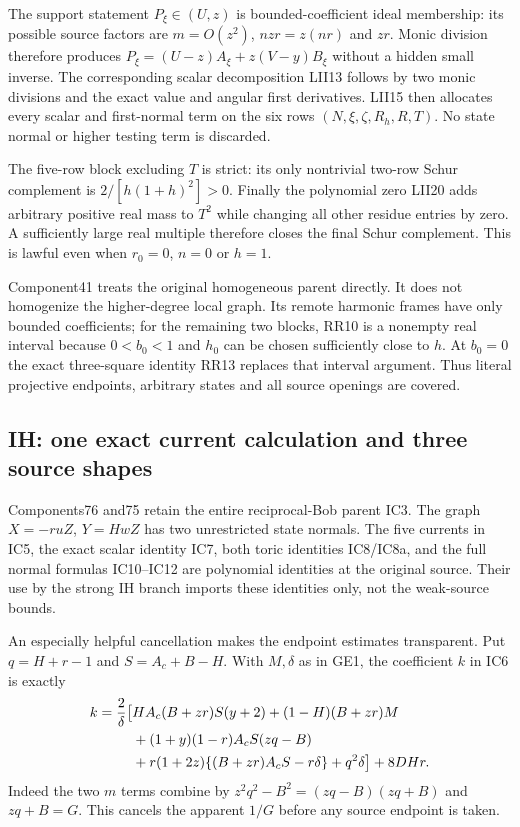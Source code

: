 The support statement $P_\xi\in(U,z)$ is bounded-coefficient ideal
membership: its possible source factors are $m=O(z^2)$,
$nzr=z(nr)$ and $zr$. Monic division therefore produces
$P_\xi=(U-z)A_\xi+z(V-y)B_\xi$ without a hidden small inverse.
The corresponding scalar decomposition LII13 follows by two monic
divisions and the exact value and angular first derivatives. LII15
then allocates every scalar and first-normal term on the six rows
$(N,\xi,\zeta,R_h,R,T)$. No state normal or higher testing term is
discarded.

The five-row block excluding $T$ is strict: its only nontrivial
two-row Schur complement is $2/[h(1+h)^2]>0$. Finally the polynomial
zero LII20 adds arbitrary positive real mass to $T^2$ while changing
all other residue entries by zero. A sufficiently large real multiple
therefore closes the final Schur complement. This is lawful even when
$r_0=0$, $n=0$ or $h=1$.

Component41 treats the original homogeneous parent directly. It does
not homogenize the higher-degree local graph. Its remote harmonic
frames have only bounded coefficients; for the remaining two blocks,
RR10 is a nonempty real interval because $0<b_0<1$ and $h_0$ can be
chosen sufficiently close to $h$. At $b_0=0$ the exact three-square
identity RR13 replaces that interval argument. Thus literal projective
endpoints, arbitrary states and all source openings are covered.

\subsection{IH: one exact current calculation and three source shapes}

Components76 and75 retain the entire reciprocal-Bob parent IC3.
The graph $X=-ruZ$, $Y=HwZ$ has two unrestricted state normals.
The five currents in IC5, the exact scalar identity IC7, both toric
identities IC8/IC8a, and the full normal formulas IC10--IC12 are
polynomial identities at the original source. Their use by the strong
IH branch imports these identities only, not the weak-source bounds.

An especially helpful cancellation makes the endpoint estimates
transparent. Put $q=H+r-1$ and $S=A_c+B-H$. With $M,\delta$ as in GE1,
the coefficient $k$ in IC6 is exactly
\[
\begin{split}
k={2\over\delta}\bigl[&HA_c(B+zr)S(y+2)
 +(1-H)(B+zr)M\\
 &+(1+y)(1-r)A_cS(zq-B)\\
 &+r(1+2z)\{(B+zr)A_cS-r\delta\}+q^2\delta\bigr]
 +8DHr.
\end{split}
\]
Indeed the two $m$ terms combine by
$z^2q^2-B^2=(zq-B)(zq+B)$ and $zq+B=G$. This cancels the apparent
$1/G$ before any source endpoint is taken.

